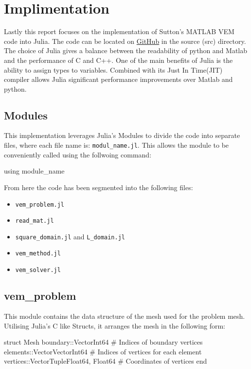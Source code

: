 \documentclass{report}
\begin{document}
\chapter{Implimentation}
Lastly this report focuses on the implementation of Sutton's MATLAB VEM code into Julia. The code can be located on \href{https://github.com/roryyarr/Summer-project-2023-2024}{GitHub} in the source (src) directory. The choice of Julia gives a balance between the readability of python and Matlab and the performance of C and C++. One of the main benefits of Julia is the ability to assign types to variables. Combined with its Just In Time(JIT) compiler allows Julia significant performance improvements over Matlab and python.\cite{Bezanson2012Julia}


\section{Modules}
This implementation leverages Julia's Modules to divide the code into separate files, where each file name is: \texttt{modul\_name.jl}. This allows the module to be conveniently called using the follwoing command:
\begin{jllisting}[style=JuliaStyle]
using module_name
\end{jllisting}

From here the code has been segmented into the following files:
\begin{itemize}
    \item \texttt{vem\_problem.jl}
    \item \texttt{read\_mat.jl}
    \item \texttt{square\_domain.jl} and \texttt{L\_domain.jl}
    \item \texttt{vem\_method.jl}
    \item \texttt{vem\_solver.jl}
    
\end{itemize}


\section{vem\_problem}

This module contains the data structure of the mesh used for the problem mesh. Utilising Julia's C like Structs, it arranges the mesh in the following form:
\begin{jllisting}[style=JuliaStyle]
struct Mesh
    boundary::Vector{Int64}    # Indices of boundary vertices
    elements::Vector{Vector{Int64}}  # Indices of vertices for each element
    vertices::Vector{Tuple{Float64, Float64}}  # Coordinates of vertices
end
\end{jllisting}
\end{document}
